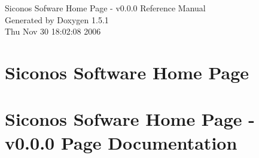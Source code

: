 \documentclass[a4paper]{book}
\begin{document}
\begin{titlepage}
\vspace*{7cm}
\begin{center}
{\Large Siconos Sofware Home Page - v0.0.0 Reference Manual}\\
\vspace*{1cm}
{\large Generated by Doxygen 1.5.1}\\
\vspace*{0.5cm}
{\small Thu Nov 30 18:02:08 2006}\\
\end{center}
\end{titlepage}
\clearemptydoublepage
{}
\tableofcontents
\clearemptydoublepage
{}
\chapter{Siconos Software Home Page }
\label{index}\hypertarget{index}{}
\chapter{Siconos Sofware Home Page - v0.0.0 Page Documentation}




\printindex
\end{document}
